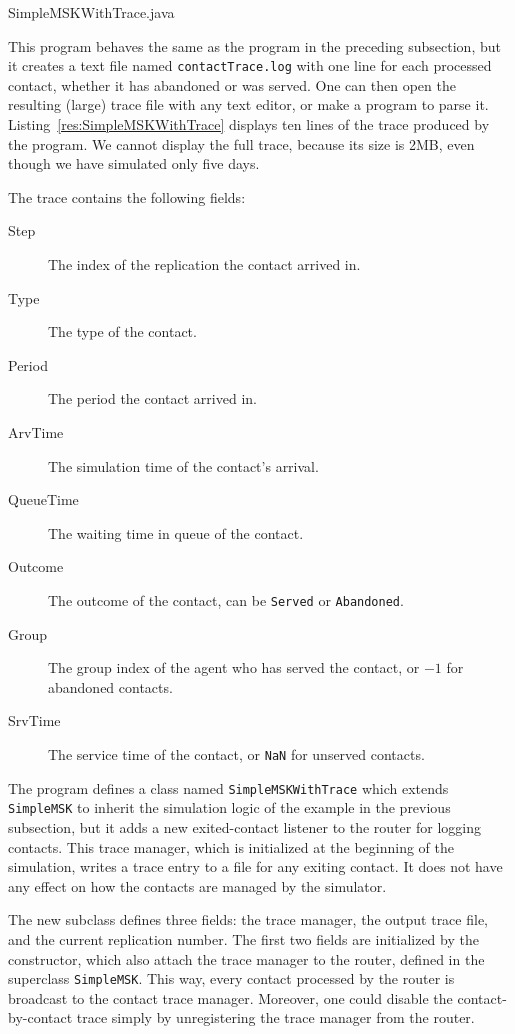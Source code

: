 
{SimpleMSKWithTrace.java}

This program behaves the same as the program in the preceding subsection,
but it creates a text file named \texttt{contactTrace.log} with one line
for each processed contact, whether it has abandoned or was served.
One can then open the resulting (large) trace file with any text
editor, or make a program to parse it.
Listing~\ref{res:SimpleMSKWithTrace} displays ten lines of the trace
produced by the program.  We cannot display the full trace, because
its size is 2MB, even though we have simulated only five days.

The trace contains the following fields:
\begin{description}
\item[Step] The index of the replication the contact arrived in.
\item[Type] The type of the contact.
\item[Period] The period the contact arrived in.
\item[ArvTime] The simulation time of the contact's arrival.
\item[QueueTime] The waiting time in queue of the contact.
\item[Outcome] The outcome of the contact, can be \texttt{Served} or \texttt{Abandoned}.
\item[Group] The group index of the agent who has served the contact, or
  $-1$ for abandoned contacts.
\item[SrvTime] The service time of the contact, or \texttt{NaN} for
  unserved contacts.
\end{description}



The program defines a class named \texttt{SimpleMSKWithTrace} which
extends \texttt{SimpleMSK} to inherit the simulation logic of the
example in the previous subsection, but it adds a new exited-contact
listener to the router for logging contacts.
This trace manager, which is initialized at the beginning of the
simulation, writes a trace entry to a file for any exiting contact.
It does not have any effect on how the contacts are managed by the
simulator.

The new subclass defines three fields: the trace manager, the output
trace file, and the current
replication number.
The first two fields are initialized by the constructor, which also
attach the trace manager to the router, defined in the superclass
\texttt{Simple\-MSK}.
This way, every contact processed by the router is broadcast to the contact
trace manager.
Moreover, one could disable the contact-by-contact trace simply by unregistering
the trace manager from the router.

